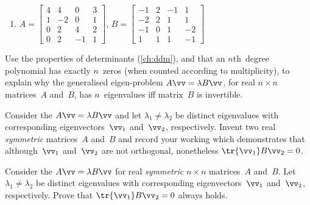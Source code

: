 \begin{exercise}
\begin{enumerate}
\item \(A=\begin{bmatrix} 4 & 4 & 0 & 3
\\ 1 & -2 & 0 & 1
\\ 0 & 2 & 4 & 2
\\ 0 & 2 & -1 & 1 \end{bmatrix}\),
\(B=\begin{bmatrix} -1 & 2 & -1 & 1
\\ -2 & 2 & 1 & 1
\\ -1 & 0 & 1 & -2
\\ 1 & 1 & 1 & -1 \end{bmatrix}\)
  
\end{enumerate}
\end{exercise}


\begin{exercise} \label{ex:} 
Use the properties of determinants (\autoref{ch:ddm}), and that an \(n\)th~degree polynomial has exactly \(n\)~zeros (when counted according to multiplicity), to explain why the generalised eigen-problem \(A\vv=\lambda B\vv\), for real \(n\times n\) matrices~\(A\) and~\(B\), has \(n\)~eigenvalues iff matrix~\(B\) is invertible.
\end{exercise}


\begin{exercise} \label{ex:} 
Consider the  \(A\vv=\lambda B\vv\) and let \(\lambda_1\neq\lambda_2\) be distinct eigenvalues with corresponding eigenvectors~\(\vv_1\) and~\(\vv_2\), respectively.
Invent two real \emph{symmetric} matrices~\(A\) and~\(B\) and record your working which demonstrates that although~\(\vv_1\) and~\(\vv_2\) are not orthogonal, nonetheless \(\tr{\vv_1}B\vv_2=0\).
\end{exercise}


\begin{exercise} \label{ex:eennmov} 
Consider the  \(A\vv=\lambda B\vv\) for real \emph{symmetric} \(n\times n\) matrices~\(A\) and~\(B\). 
Let \(\lambda_1\neq\lambda_2\) be distinct eigenvalues with corresponding eigenvectors~\(\vv_1\) and~\(\vv_2\), respectively.
Prove that \(\tr{\vv_1}B\vv_2=0\) always holds.
\end{exercise}


